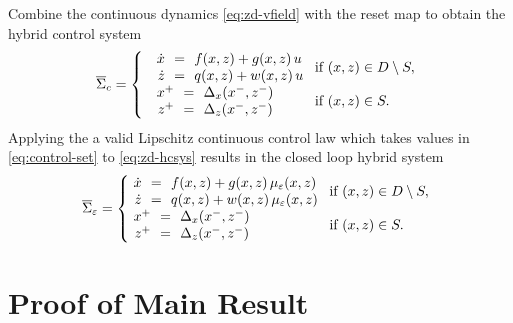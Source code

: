 \documentclass[twocolumn]{article}
\begin{document}
Combine the continuous dynamics \eqref{eq:zd-vfield} with the reset map to obtain the hybrid control system
\begin{align}
  \label{eq:zd-hcsys}
  \HCSbar= \left\{
  \begin{array}{l l}
    \begin{array}{r c l}
      {\dot \zdx} &\!\!=\!\!& f\argsxz + g\argsxz \, u\\
      {\dot \zdz} &\!\!=\!\!& q\argsxz + w\argsxz \, u
    \end{array} \!\! & \!\! \mbox{if } \argsxz \in \D \setminus \S,\\
    \begin{array}{r c l}
      \zdx^{+} &\!\!=\!\!& \Delta_{\zdx}(\zdx^{-}, \zdz^{-})\\
      \zdz^{+} &\!\!=\!\!& \Delta_{\zdz}(\zdx^{-}, \zdz^{-})
    \end{array} \!\! & \!\! \mbox{if } \argsxz \in \S.
  \end{array}\right.
\end{align}
%
Applying the a valid Lipschitz continuous control law which takes values in \eqref{eq:control-set} to \eqref{eq:zd-hcsys} results in the closed loop hybrid system
%
\begin{align}
  \label{eq:zd-hsys-cl}
  \HSbar_{\resclfparam} = \left\{\!\!\!\!
  \begin{array}{l l}
    \begin{array}{r c l}
      {\dot \zdx} &\!\!=\!\!& f\argsxz + g\argsxz \, \mueps\argsxz\\
      {\dot \zdz} &\!\!=\!\!& q\argsxz + w\argsxz \, \mueps\argsxz
    \end{array} \!\! & \!\! \mbox{if } \argsxz \in \D \setminus \S,\\
    \begin{array}{r c l}
      \zdx^{+} &\!\!=\!\!& \Delta_{\zdx}(\zdx^{-}, \zdz^{-})\\
      \zdz^{+} &\!\!=\!\!& \Delta_{\zdz}(\zdx^{-}, \zdz^{-})
    \end{array} \!\! & \!\! \mbox{if } \argsxz \in \S.
  \end{array}\right.
\end{align}

\section{Proof of Main Result}
\end{document}
